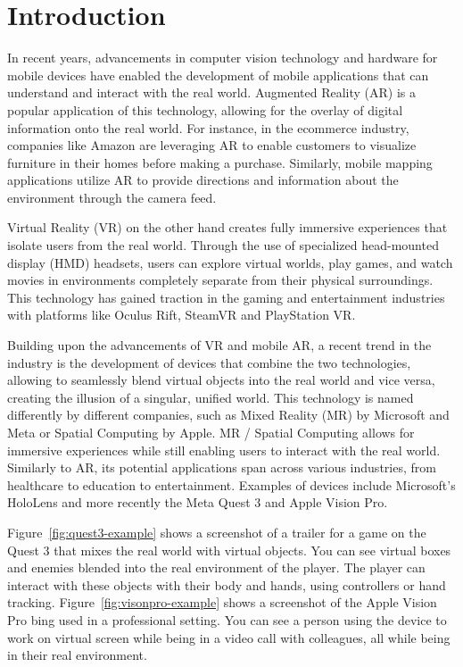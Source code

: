 \chapter{Introduction}
In recent years, advancements in computer vision technology and hardware for mobile devices
have enabled the development of mobile applications that can understand and interact with the real world.
Augmented Reality (AR) is a popular application of this technology,
allowing for the overlay of digital information onto the real world.
For instance, in the ecommerce industry, companies like Amazon are leveraging AR to
enable customers to visualize furniture in their homes before making a purchase.
Similarly, mobile mapping applications utilize AR to provide directions and information about the
environment through the camera feed.

Virtual Reality (VR) on the other hand creates fully immersive experiences
that isolate users from the real world.
Through the use of specialized head-mounted display (HMD) headsets, users can explore virtual worlds,
play games, and watch movies in environments completely separate from their physical surroundings.
This technology has gained traction in the gaming and entertainment industries
with platforms like Oculus Rift, SteamVR and PlayStation VR.

Building upon the advancements of VR and mobile AR,
a recent trend in the industry is the development of devices that combine the two technologies,
allowing to seamlessly blend virtual objects into the real world and vice versa, creating the illusion of a singular, unified world.
This technology is named differently by different companies, such as Mixed Reality (MR) by Microsoft and Meta
or Spatial Computing by Apple.
MR / Spatial Computing allows for immersive experiences while still enabling users to interact with the real world.
Similarly to AR, its potential applications span across various industries, from healthcare to education to entertainment.
Examples of devices include Microsoft's HoloLens and more recently the Meta Quest 3 and Apple Vision Pro.

Figure~\ref{fig:quest3-example} shows a screenshot of a trailer for a game on the Quest 3 that mixes the real world with virtual objects.
You can see virtual boxes and enemies blended into the real environment of the player.
The player can interact with these objects with their body and hands, using controllers or hand tracking.
Figure~\ref{fig:visonpro-example} shows a screenshot of the Apple Vision Pro bing used in a professional setting.
You can see a person using the device to work on virtual screen while being in a video call with colleagues,
all while being in their real environment.


